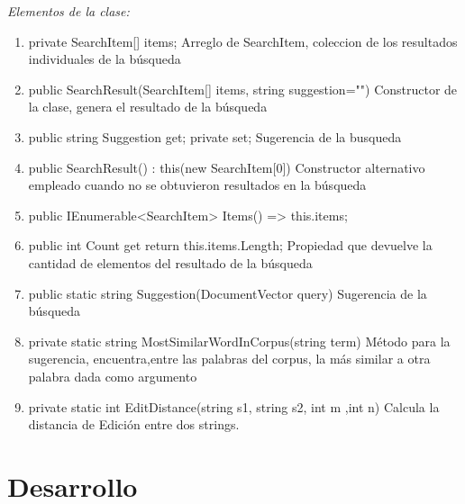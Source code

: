 \documentclass[a4paper,12pt]{article}
\begin{document}
\emph{Elementos de la clase:}
\begin{enumerate}
    \item private SearchItem[] items;
    Arreglo de SearchItem, coleccion de los resultados individuales de la búsqueda
    \item public SearchResult(SearchItem[] items, string suggestion="")
    Constructor de la clase, genera el resultado de la búsqueda
    \item public string Suggestion { get; private set; }
    Sugerencia de la busqueda
    \item public SearchResult() : this(new SearchItem[0]) {}
    Constructor alternativo empleado cuando no se obtuvieron resultados en la búsqueda
    \item public IEnumerable<SearchItem> Items() => this.items;
    \item public int Count { get { return this.items.Length; } }
    Propiedad que devuelve la cantidad de elementos del resultado de la búsqueda
    \item public static string Suggestion(DocumentVector query)
    Sugerencia de la búsqueda
    \item private static string MostSimilarWordInCorpus(string term)
    Método para la sugerencia, encuentra,entre las palabras del corpus, la más similar 
    a otra palabra dada como argumento
    \item private static int EditDistance(string s1, string s2, int m ,int n)
    Calcula la distancia de Edición entre dos strings.
\end{enumerate}

\section{Desarrollo}
\end{document}
